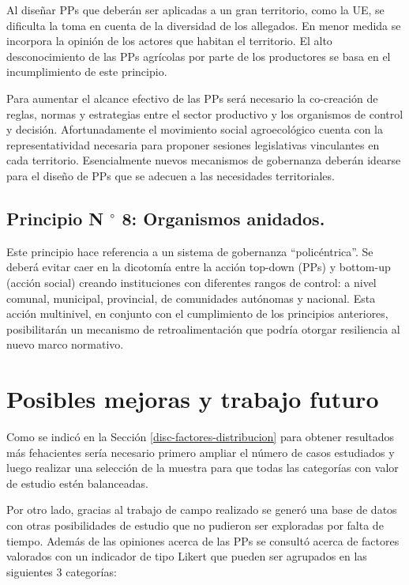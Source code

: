 \documentclass[a4paper, nobind]{templates/ociamthesis}
\begin{document}
Al diseñar PPs que deberán ser aplicadas a un gran territorio, como la UE, se dificulta la toma en cuenta de la diversidad de los allegados.
En menor medida se incorpora la opinión de los actores que habitan el territorio.
El alto desconocimiento de las PPs agrícolas por parte de los productores se basa en el incumplimiento de este principio.

Para aumentar el alcance efectivo de las PPs será necesario la co-creación de reglas, normas y estrategias entre el sector productivo y los organismos de control y decisión.
Afortunadamente el movimiento social agroecológico cuenta con la representatividad necesaria para proponer sesiones legislativas vinculantes en cada territorio.
Esencialmente nuevos mecanismos de gobernanza deberán idearse para el diseño de PPs que se adecuen a las necesidades territoriales.

\hypertarget{principio-n-circ-8-organismos-anidados.}{%
\subsection{\texorpdfstring{Principio N \(^{\circ}\) 8: Organismos anidados.}{Principio N \^{}\{\textbackslash circ\} 8: Organismos anidados.}}\label{principio-n-circ-8-organismos-anidados.}}

Este principio hace referencia a un sistema de gobernanza ``policéntrica''.
Se deberá evitar caer en la dicotomía entre la acción top-down (PPs) y bottom-up (acción social) creando instituciones con diferentes rangos de control: a nivel comunal, municipal, provincial, de comunidades autónomas y nacional.
Esta acción multinivel, en conjunto con el cumplimiento de los principios anteriores, posibilitarán un mecanismo de retroalimentación que podría otorgar resiliencia al nuevo marco normativo.

\hypertarget{posibles-mejoras-y-trabajo-futuro}{%
\section{Posibles mejoras y trabajo futuro}\label{posibles-mejoras-y-trabajo-futuro}}

Como se indicó en la Sección \ref{disc-factores-distribucion} para obtener resultados más fehacientes sería necesario primero ampliar el número de casos estudiados y luego realizar una selección de la muestra para que todas las categorías con valor de estudio estén balanceadas.

Por otro lado, gracias al trabajo de campo realizado se generó una base de datos con otras posibilidades de estudio que no pudieron ser exploradas por falta de tiempo. Además de las opiniones acerca de las PPs se consultó acerca de factores valorados con un indicador de tipo Likert que pueden ser agrupados en las siguientes 3 categorías:
\end{document}
